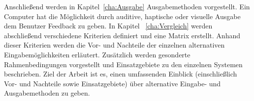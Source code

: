 \newline \newline
Anschließend werden in Kapitel~\ref{cha:Ausgabe} Ausgabemethoden vorgestellt. Ein Computer hat die Möglichkeit durch auditive, haptische oder visuelle Ausgabe dem Benutzer Feedback zu geben.
\newline \newline
In Kapitel ~\ref{cha:Vergleich} werden abschließend verschiedene Kriterien definiert und eine Matrix erstellt. Anhand dieser Kriterien werden die Vor- und Nachteile der einzelnen alternativen Eingabemöglichkeiten erläutert. Zusätzlich werden gesonderte Rahmenbedingungen vorgestellt und Einsatzgebiete zu den einzelnen Systemen beschrieben.
\newline \newline
Ziel der Arbeit ist es, einen umfassenden Einblick (einschließlich Vor- und Nachteile sowie Einsatzgebiete) über alternative Eingabe- und Ausgabemethoden zu geben.
